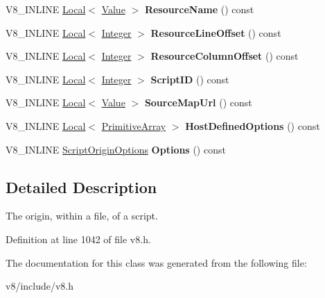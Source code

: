 \begin{DoxyCompactItemize}
\item 
\mbox{\label{classv8_1_1ScriptOrigin_ac9dcd4520325ea2e776ff55aa7992cb1}} 
V8\+\_\+\+I\+N\+L\+I\+NE \mbox{\hyperlink{classv8_1_1Local}{Local}}$<$ \mbox{\hyperlink{classv8_1_1Value}{Value}} $>$ {\bfseries Resource\+Name} () const
\item 
\mbox{\label{classv8_1_1ScriptOrigin_ae9f8419ea44b2b0d9e249f2c6825e8cd}} 
V8\+\_\+\+I\+N\+L\+I\+NE \mbox{\hyperlink{classv8_1_1Local}{Local}}$<$ \mbox{\hyperlink{classv8_1_1Integer}{Integer}} $>$ {\bfseries Resource\+Line\+Offset} () const
\item 
\mbox{\label{classv8_1_1ScriptOrigin_a75794aa0bda3508406b97cf66ac47682}} 
V8\+\_\+\+I\+N\+L\+I\+NE \mbox{\hyperlink{classv8_1_1Local}{Local}}$<$ \mbox{\hyperlink{classv8_1_1Integer}{Integer}} $>$ {\bfseries Resource\+Column\+Offset} () const
\item 
\mbox{\label{classv8_1_1ScriptOrigin_ae4431018214bd4512c6c0f8168ca3101}} 
V8\+\_\+\+I\+N\+L\+I\+NE \mbox{\hyperlink{classv8_1_1Local}{Local}}$<$ \mbox{\hyperlink{classv8_1_1Integer}{Integer}} $>$ {\bfseries Script\+ID} () const
\item 
\mbox{\label{classv8_1_1ScriptOrigin_ae2db076b4c2b206ce1a3242e3a3105fe}} 
V8\+\_\+\+I\+N\+L\+I\+NE \mbox{\hyperlink{classv8_1_1Local}{Local}}$<$ \mbox{\hyperlink{classv8_1_1Value}{Value}} $>$ {\bfseries Source\+Map\+Url} () const
\item 
\mbox{\label{classv8_1_1ScriptOrigin_a90ff0e8c56f7fa08c3d2e88121e49868}} 
V8\+\_\+\+I\+N\+L\+I\+NE \mbox{\hyperlink{classv8_1_1Local}{Local}}$<$ \mbox{\hyperlink{classv8_1_1PrimitiveArray}{Primitive\+Array}} $>$ {\bfseries Host\+Defined\+Options} () const
\item 
\mbox{\label{classv8_1_1ScriptOrigin_a7c3f46da497196187eb53bcec86936cf}} 
V8\+\_\+\+I\+N\+L\+I\+NE \mbox{\hyperlink{classv8_1_1ScriptOriginOptions}{Script\+Origin\+Options}} {\bfseries Options} () const
\end{DoxyCompactItemize}


\subsection{Detailed Description}
The origin, within a file, of a script. 

Definition at line 1042 of file v8.\+h.



The documentation for this class was generated from the following file\+:\begin{DoxyCompactItemize}
\item 
v8/include/v8.\+h\end{DoxyCompactItemize}
